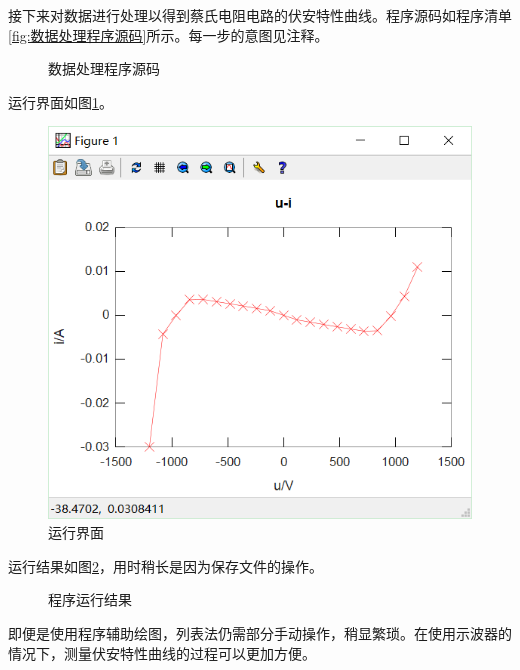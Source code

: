 \documentclass{article}
\begin{document}
\newpage

接下来对数据进行处理以得到蔡氏电阻电路的伏安特性曲线。程序源码如程序清单\ref{fig:数据处理程序源码}所示。每一步的意图见注释。

\begin{figure}[htpb]
	\centering
	\caption{数据处理程序源码}
\end{figure}

\newpage

运行界面如图\ref{fig:运行界面}。

\begin{figure}[htpb]
	\centering
	\includegraphics[width=0.6\linewidth]{ChuaRm.png}
	\caption{运行界面}
	\label{fig:运行界面}
\end{figure}

运行结果如图\ref{fig:程序运行结果}，用时稍长是因为保存文件的操作。

\begin{figure}[htpb]
	\centering
	\caption{程序运行结果}
	\label{fig:程序运行结果}
\end{figure}

\newpage

即便是使用程序辅助绘图，列表法仍需部分手动操作，稍显繁琐。在使用示波器的情况下，测量伏安特性曲线的过程可以更加方便。
\end{document}
